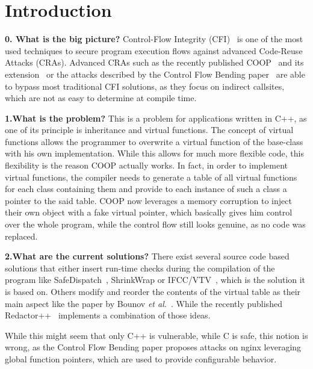 \section{Introduction}
\label{chapter:Introduction}

\textbf{0. What is the big picture?}
Control-Flow Integrity (CFI)~\cite{abadi:cfi2, abadi:cfi} is one of the most used techniques to secure program execution 
flows against advanced Code-Reuse Attacks (CRAs). Advanced CRAs such as the recently published COOP~\cite{schuster:coop} 
and its extension~\cite{crane:readactor++} or the attacks described by the Control Flow Bending paper~\cite{carlini:bending}
are able to bypass most traditional CFI solutions, as they focus on indirect callsites, which are not as easy to determine at compile time.

\textbf{1.What is the problem?}
This is a problem for applications written in C++, as one of its principle is inheritance and virtual functions. 
The concept of virtual functions allows the programmer to overwrite a virtual function of the base-class with his
own implementation. While this allows for much more flexible code, this flexibility is the reason COOP actually 
works. In fact, in order to implement virtual functions, the compiler needs to generate a table of all
virtual functions for each class containing them and provide to each instance of such a class a pointer
to the said table. COOP now leverages a memory corruption to inject their own object with a fake virtual pointer, 
which basically gives him control over the whole program, while the control flow still looks genuine, as no 
code was replaced. 

\textbf{2.What are the current solutions?} There exist several source code based solutions that either insert run-time checks during the compilation of 
the program like SafeDispatch~\cite{safedispatch:jang}, ShrinkWrap \cite{haller:shrinkwrap} or IFCC/VTV~\cite{vtv:tice}, 
which is the solution it is based on. Others modify and reorder the contents of the virtual table as their main 
aspect like the paper by Bounov \textit{et al.}~\cite{bounov:interleaving}. While the recently published Redactor++~\cite{crane:readactor++}
implements a combination of those ideas.

While this might seem that only C++ is vulnerable, while C is safe, this notion is wrong, as the 
Control Flow Bending paper \cite{carlini:bending} proposes attacks on nginx leveraging global 
function pointers, which are used to provide configurable behavior.

